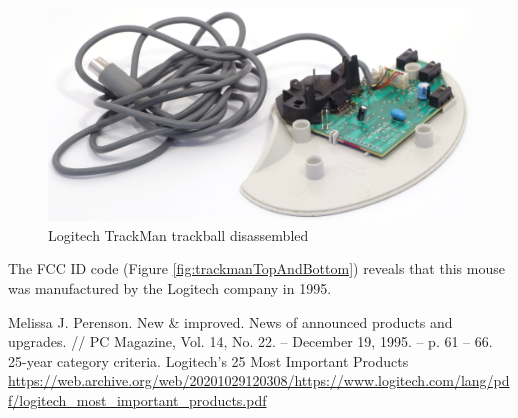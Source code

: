\documentclass[11pt, a4paper]{article}
\begin{document}
\begin{figure}[h]
    \centering
    \includegraphics[scale=0.6]{1995_logitech_trackman/inside_30.jpg}
    \caption{Logitech TrackMan trackball disassembled}
    \label{fig:trackmanInside}
\end{figure}

 The FCC ID code (Figure \ref{fig:trackmanTopAndBottom}) reveals that this mouse was manufactured by the Logitech company in 1995.


\begin{thebibliography}{9}
 Melissa J. Perenson. New \& improved. News of announced products and upgrades. // PC Magazine, Vol. 14, No. 22. -- December 19, 1995. -- p. 61 -- 66.
 25-year category criteria. Logitech’s 25 Most Important Products \url{https://web.archive.org/web/20201029120308/https://www.logitech.com/lang/pdf/logitech_most_important_products.pdf}
\end{thebibliography}
\end{document}
